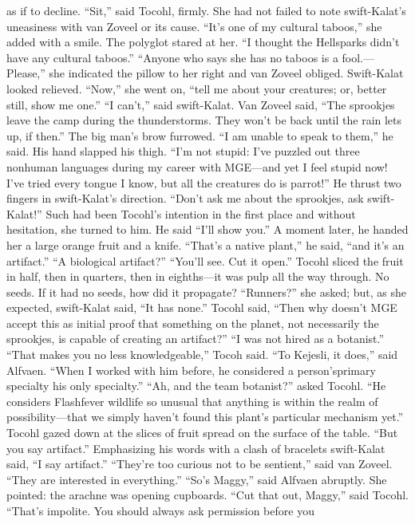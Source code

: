 \documentclass[9pt]{article}
\begin{document}
as if to decline.
“Sit,” said Tocohl, firmly. She had not failed to note swift-Kalat’s uneasiness with van Zoveel or its
cause. “It’s one of my cultural taboos,” she added with a smile.
The polyglot stared at her. “I thought the Hellsparks didn’t have any cultural taboos.”
“Anyone who says she has no taboos is a fool.—Please,” she indicated the pillow to her right and
van Zoveel obliged. Swift-Kalat looked relieved.
“Now,” she went on, “tell me about your creatures; or, better still, show me one.”
“I can’t,” said swift-Kalat.
Van Zoveel said, “The sprookjes leave the camp during the thunderstorms. They won’t be back until
the rain lets up, if then.” The big man’s brow furrowed. “I am unable to speak to them,” he said. His
hand slapped his thigh. “I’m not stupid: I’ve puzzled out three nonhuman languages during my career with
MGE—and yet I feel stupid now! I’ve tried every tongue I know, but all the creatures do is parrot!” He
thrust two fingers in swift-Kalat’s direction. “Don’t ask me about the sprookjes, ask swift-Kalat!”
Such had been Tocohl’s intention in the first place and without hesitation, she turned to him. He said
“I’ll show you.” A moment later, he handed her a large orange fruit and a knife.
“That’s a native plant,” he said, “and it’s an artifact.”
“A biological artifact?”
“You’ll see. Cut it open.”
Tocohl sliced the fruit in half, then in quarters, then in eighths—it was pulp all the way through. No
seeds. If it had no seeds, how did it propagate? “Runners?” she asked; but, as she expected, swift-Kalat
said, “It has none.”
Tocohl said, “Then why doesn’t MGE accept this as initial proof that something on the planet, not
necessarily the sprookjes, is capable of creating an artifact?”
“I was not hired as a botanist.”
“That makes you no less knowledgeable,” Tocoh said.
“To Kejesli, it does,” said Alfvaen. “When I worked with him before, he considered a person’sprimary specialty his only specialty.”
“Ah, and the team botanist?” asked Tocohl.
“He considers Flashfever wildlife so unusual that anything is within the realm of possibility—that we
simply haven’t found this plant’s particular mechanism yet.”
Tocohl gazed down at the slices of fruit spread on the surface of the table. “But you say artifact.”
Emphasizing his words with a clash of bracelets swift-Kalat said, “I say artifact.”
“They’re too curious not to be sentient,” said van Zoveel. “They are interested in everything.”
“So’s Maggy,” said Alfvaen abruptly. She pointed: the arachne was opening cupboards.
“Cut that out, Maggy,” said Tocohl. “That’s impolite. You should always ask permission before you
\end{document}
